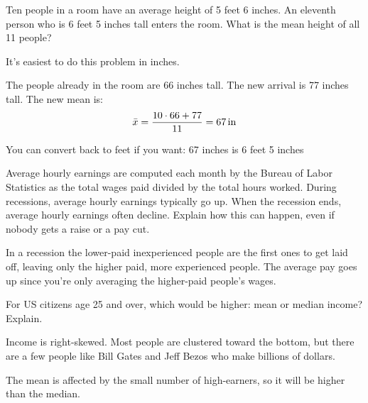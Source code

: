 \documentclass[letterpaper, landscape]{exam}
\begin{document}
  \begin{questions}

    \question[5] Ten people in a room have an average height of 5 feet 6 inches.
    An eleventh person who is 6 feet 5 inches tall enters the room. What is the
    mean height of all 11 people? 

    \begin{solution}
      It's easiest to do this problem in inches.

      The people already in the room are 66 inches tall. The new arrival is 77
      inches tall. The new mean is:
      \[
        \bar{x} = \frac{10 \cdot 66 + 77}{11} = \unit[67]{in}
      \]

      You can convert back to feet if you want: 67 inches is 6 feet 5 inches
    \end{solution}

    \question[5] Average hourly earnings are computed each month by the Bureau
    of Labor Statistics as the total wages paid divided by the total hours
    worked. During recessions, average hourly earnings typically go up. When the
    recession ends, average hourly earnings often decline.  Explain how this can
    happen, even if nobody gets a raise or a pay cut. 

    \begin{solution}
      In a recession the lower-paid inexperienced people are the first ones to
      get laid off, leaving only the higher paid, more experienced people. The
      average pay goes up since you're only averaging the higher-paid people's
      wages.
    \end{solution}

    \question[5] For US citizens age 25 and over, which would be higher: mean or
    median income?  Explain.

    \begin{solution}
      Income is right-skewed. Most people are clustered toward the bottom, but
      there are a few people like Bill Gates and Jeff Bezos who make billions of
      dollars.

      The mean is affected by the small number of high-earners, so it will be
      higher than the median.
    \end{solution}


\end{questions}
\end{document}

